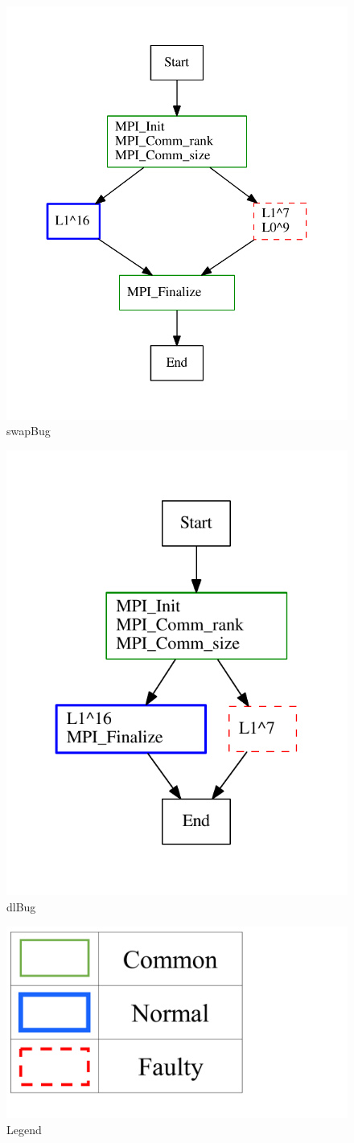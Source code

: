 \begin{figure}[]
    \centering
\includegraphics[width=.6\textwidth]{diffTrace/figs/b-11.mpi.0K10-5.pdf}
\caption{swapBug}
\label{fig:swapbug}
\end{figure}
\begin{figure}[]
\centering
\includegraphics[width=.6\linewidth]{diffTrace/figs/adl-11.mpi.0K10-5.pdf}
\caption{dlBug}
\label{fig:dlbug}
\end{figure}

\begin{figure}[]
\centering
\includegraphics[width=.2\textwidth]{diffTrace/figs/legend.pdf}
\caption{Legend}
\label{fig:legend}
\end{figure}



